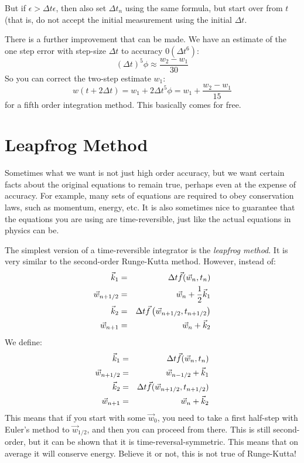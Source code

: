 But if $\epsilon > \Delta t \epsilon$, then also set $\Delta t_n$
using the same formula, but start over from $t$ (that is, do not
accept the initial measurement using the initial $\Delta t$.

There is a further improvement that can be made. We have an estimate
of the one step error with step-size $\Delta t$ to accuracy
$\mathcal{0}(\Delta t^6)$:
\begin{equation}
  (\Delta t)^5 \phi \approx \frac{w_2 - w_1}{30}
\end{equation}
So you can correct the two-step estimate $w_1$:
\begin{equation}
w(t+ 2\Delta t) = w_1 + 2 \Delta t^5 \phi = w_1 + 
  \frac{w_2 - w_1}{15}
\end{equation}
for a fifth order integration method. This basically comes for free. 

\section{Leapfrog Method}

Sometimes what we want is not just high order accuracy, but we want
certain facts about the original equations to remain true, perhaps
even at the expense of accuracy. For example, many sets of equations
are required to obey conservation laws, such as momentum, energy,
etc. It is also sometimes nice to guarantee that the equations you are
using are time-reversible, just like the actual equations in physics
can be.

The simplest version of a time-reversible integrator is the {\it leapfrog
  method}. It is very similar to the second-order Runge-Kutta method. 
However, instead of:
\begin{eqnarray}
\vec{k}_1 &=& \Delta t \vec{f}(\vec{w}_n, t_n) \cr
\vec{w}_{n+1/2} &=& \vec{w}_n + \frac{1}{2}\vec{k}_1 \cr
\vec{k}_2 &=& \Delta t \vec{f}\left(\vec{w}_{n+1/2}, t_{n+1/2}\right) \cr
\vec{w}_{n+1} &=& \vec{w}_n + \vec{k}_2
\end{eqnarray}
We define:
\begin{eqnarray}
\vec{k}_1 &=& \Delta t \vec{f}(\vec{w}_n, t_n) \cr
\vec{w}_{n+1/2} &=& \vec{w}_{n-1/2} + \vec{k}_1 \cr
\vec{k}_2 &=& \Delta t \vec{f}(\vec{w}_{n+1/2}, t_{n+1/2}) \cr
\vec{w}_{n+1} &=& \vec{w}_{n} + \vec{k}_2
\end{eqnarray}
This means that if you start with some $\vec{w}_0$, you need to take a
first half-step with Euler's method to $\vec{w}_{1/2}$, and then you
can proceed from there. This is still second-order, but it can be
shown that it is time-reversal-symmetric. This means that on average
it will conserve energy. Believe it or not, this is not true of
Runge-Kutta!

